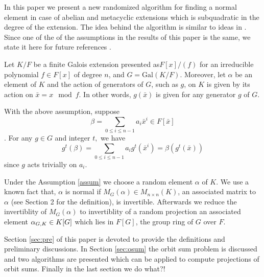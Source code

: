 In this paper we present a new randomized algorithm for finding a normal
element in case of abelian and metacyclic extensions which is subquadratic
in the degree of the extension. The idea behind the algorithm is similar to
ideas in \cite{Giesbrecht,Kaltofen}. Since one of the of the assumptions in
the results of this paper is the same, we state it here for future
references .

\begin{assumption}
  \label{assum}
  Let $K/F$ be a finite Galois extension presented as$F[x]/(f)$ for an
  irreducible polynomial $f\in F[x]$ of degree $n$, and
  $G = \mathrm{Gal}(K/F)$. Moreover, let $\alpha$ be an element of $K$ and
  the action of generators of $G$, such as $g$, on $K$ is given by its
  action on $\bar{x} = x \mod f.$ In other words, $g(\bar{x})$ is given for
  any generator $g$ of $G$.
\end{assumption}

\begin{remark}
  With the above assumption, suppose
  $$\beta = \sum_{0\leq i \leq n-1} a_i \bar{x}^i \in F[\bar{x}]$$. For any
  $g \in G$ and integer $t,$ we have
  \begin{equation}
    \label{rmk:comute}
    g^t(\beta) = \sum_{0\leq i \leq n-1} a_i g^t(\bar{x}^i) = \beta(g^t(\bar{x}))
  \end{equation}
  since $g$ acts trivially on $a_i$.
\end{remark}

Under the Assumption \ref{assum} we choose a random element $\alpha$ of
$K$. We use a known fact that, $\alpha$ is normal if
$M_G(\alpha) \in M_{n\times n}(K)$, an associated matrix to $\alpha$ (see
Section 2 for the definition), is invertible.  Afterwards we reduce the
invertiblity of $M_G(\alpha)$ to invertiblity of a random projection an
associated element $\alpha_{G,K} \in K[G]$ which lies in $F[G]$, the group
ring of $G$ over $F$.

Section \ref{sec:pre} of this paper is devoted to provide the definitions
and preliminary discussions. In Section \ref{sec:osum} the orbit sum
problem is discussed and two algorithms are presented which can be applied
to compute projections of orbit sums.  Finally in the last section we do
what?!

